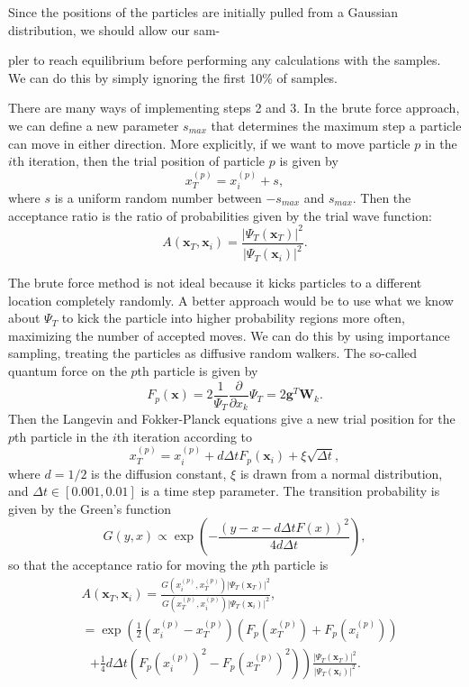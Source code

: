 \documentclass[prb,aps,twocolumn,showpacs,10pt]{revtex4-1}
\begin{document}
Since the positions of the particles are initially pulled from a Gaussian distribution, we should allow our sam-

\noindent pler to reach equilibrium before performing any calculations with the samples. We can do this by simply ignoring the first 10\% of samples. 

There are many ways of implementing steps 2 and 3. In the brute force approach, we can define a new parameter $s_{max}$ that determines the maximum step a particle can move in either direction. More explicitly, if we want to move particle $p$ in the $i$th iteration, then the trial position of particle $p$ is given by
\begin{equation}
x_T^{(p)} = x_i^{(p)} + s,
\end{equation}
where $s$ is a uniform random number between $-s_{max}$ and $s_{max}$. Then the acceptance ratio is the ratio of probabilities given by the trial wave function:
\begin{equation}
A(\bm{x}_T, \bm{x}_i) = \frac{|\Psi_T(\bm{x}_T)|^2}{|\Psi_T(\bm{x}_i)|^2}.
\end{equation}

The brute force method is not ideal because it kicks particles to a different location completely randomly. A better approach would be to use what we know about $\Psi_T$ to kick the particle into higher probability regions more often, maximizing the number of accepted moves. We can do this by using importance sampling, treating the particles as diffusive random walkers. The so-called quantum force on the $p$th particle is given by
\begin{equation}
F_p(\bm{x}) = 2 \frac{1}{\Psi_T} \frac{\partial}{\partial x_k} \Psi_T = 2 \bm{g}^T \bm{W}_k.
\end{equation}
Then the Langevin and Fokker-Planck equations give a new trial position for the $p$th particle in the $i$th iteration according to
\begin{equation}
x_T^{(p)} = x_i^{(p)} + d \Delta t F_p(\bm{x}_i)+\xi \sqrt{\Delta t},
\end{equation}
where $d = 1/2$ is the diffusion constant, $\xi$ is drawn from a normal distribution, and $\Delta t \in [0.001, 0.01]$ is a time step parameter. The transition probability is given by the Green's function
\begin{equation}
G(y,x) \propto \exp \left( - \frac{(y-x-d \Delta t F(x))^2}{4d \Delta t} \right),
\end{equation}
so that the acceptance ratio for moving the $p$th particle is
\begin{align}
&A(\bm{x}_T, \bm{x}_i) = \frac{G(x_i^{(p)},x_T^{(p)})|\Psi_T(\bm{x}_T)|^2}{G(x_T^{(p)},x_i^{(p)})|\Psi_T(\bm{x}_i)|^2},\\
&= \exp \left( \frac{1}{2}(x_i^{(p)}-x_T^{(p)}) \left(F_p(x_T^{(p)}) + F_p(x_i^{(p)}) \right) \right. \\
&\ \ \ \left. + \frac{1}{4} d \Delta t \left( F_p(x_i^{(p)})^2-F_p(x_T^{(p)})^2 \right) \right)  \frac{|\Psi_T(\bm{x}_T)|^2}{|\Psi_T(\bm{x}_i)|^2}.
\end{align}
\end{document}
